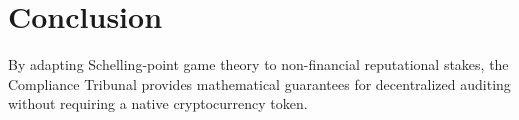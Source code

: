 \documentclass[11pt,a4paper]{article}
\begin{document}
\section{Conclusion}
By adapting Schelling-point game theory to non-financial reputational stakes, the Compliance Tribunal provides mathematical guarantees for decentralized auditing without requiring a native cryptocurrency token.
\end{document}
